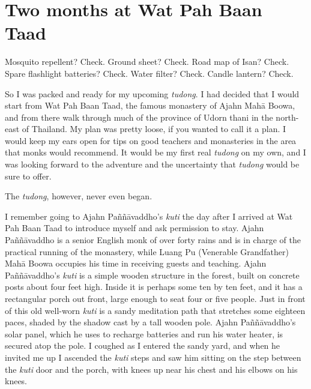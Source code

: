 

\chapter{Two months at Wat Pah Baan Taad}
\markright{\chapterAuthor}

Mosquito repellent? Check. Ground sheet? Check. Road map of Isan? Check.
Spare flashlight batteries? Check. Water filter? Check. Candle lantern?
Check.

So I was packed and ready for my upcoming \emph{tudong}. I had decided
that I would start from Wat Pah Baan Taad, the famous monastery of Ajahn
Mahā Boowa, and from there walk through much of the province of Udorn
thani in the north-east of Thailand. My plan was pretty loose, if you
wanted to call it a plan. I would keep my ears open for tips on good
teachers and monasteries in the area that monks would recommend. It
would be my first real \emph{tudong} on my own, and I was looking
forward to the adventure and the uncertainty that \emph{tudong} would be
sure to offer.

The \emph{tudong}, however, never even began.

I remember going to Ajahn Paññāvaddho's \emph{kuti} the day after I
arrived at Wat Pah Baan Taad to introduce myself and ask permission to
stay. Ajahn Paññāvaddho is a senior English monk of over forty rains and
is in charge of the practical running of the monastery, while Luang Pu
(Venerable Grandfather) Mahā Boowa occupies his time in receiving guests
and teaching. Ajahn Paññāvaddho's \emph{kuti} is a simple wooden
structure in the forest, built on concrete posts about four feet high.
Inside it is perhaps some ten by ten feet, and it has a rectangular
porch out front, large enough to seat four or five people. Just in front
of this old well-worn \emph{kuti} is a sandy meditation path that
stretches some eighteen paces, shaded by the shadow cast by a tall
wooden pole. Ajahn Paññāvaddho's solar panel, which he uses to recharge
batteries and run his water heater, is secured atop the pole. I coughed
as I entered the sandy yard, and when he invited me up I ascended the
\emph{kuti} steps and saw him sitting on the step between the
\emph{kuti} door and the porch, with knees up near his chest and his
elbows on his knees.

